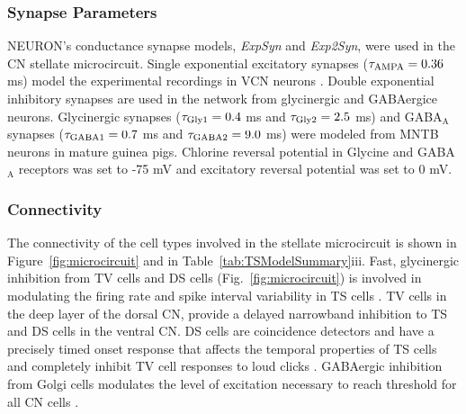 \subsubsection{Synapse Parameters}

NEURON's conductance synapse models, {\it ExpSyn} and {\it
  Exp2Syn}, were used in the CN stellate microcircuit.  Single
exponential excitatory synapses ($\tau _{{\rm AMPA}}=0.36$~ ms)
model the experimental recordings in VCN neurons
\cite{GardnerTrussellEtAl:1999}.  Double exponential inhibitory
synapses are used in the network from glycinergic and GABAergice
neurons. Glycinergic synapses \cite{LeaoOleskevichEtAl:2004} ($\tau
_{{\rm Gly1}}=0.4$ ms and $\tau _{{\rm Gly2}}=2.5$ ms) and
GABA$_{\mathrm{A}}$ synapses
\cite{AwatramaniTurecekEtAl:2005}($\tau _{{\rm GABA1}}=0.7$ ms and
$\tau _{{\rm GABA2}}=9.0$ ms) were modeled from MNTB neurons in
mature guinea pigs.  Chlorine reversal potential in Glycine and
GABA$_{\mathrm{A}}$ receptors was set to -75 mV and excitatory
reversal potential was set to 0 mV.


\subsubsection{Connectivity}

The connectivity of the cell types involved in the stellate
microcircuit is shown in Figure~\ref{fig:microcircuit} and in
Table~\ref{tab:TSModelSummary}iii. Fast, glycinergic inhibition from
TV cells and DS cells (Fig.~\ref{fig:microcircuit}) is involved in modulating the firing rate and
spike interval variability in TS cells
\cite{FerragamoGoldingEtAl:1998,WickesbergOertel:1993}. TV cells
in the deep layer of the dorsal CN, provide a delayed narrowband
inhibition to TS and DS cells in the ventral CN\@.  
DS cells are coincidence detectors and have a precisely timed onset
response that affects the temporal properties of TS cells
\cite{PaoliniClareyEtAl:2005,RhodeGreenberg:1994a} and completely
inhibit TV cell responses to loud clicks
\cite{SpirouDavisEtAl:1999}. GABAergic inhibition from Golgi cells
modulates the level of excitation necessary to reach threshold for
all CN cells
\cite{CasparyBackoffEtAl:1994,FerragamoGoldingEtAl:1998}.




